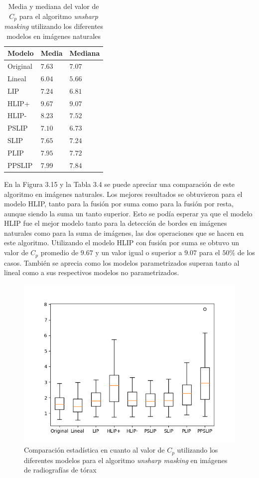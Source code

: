 \begin{table}
	\begin{center}
		\begin{tabular}{|l|l|l|}
			\hline 
			Modelo & Media & Mediana\\
			\hline
			Original & $7.63$ & $7.07$\\
			\hline
			Lineal & $6.04$ & $5.66$\\
			\hline
			LIP & $7.24$ & $6.81$\\
			\hline
			HLIP+ & $9.67$ & $9.07$\\
			\hline
			HLIP- & $8.23$ & $7.52$\\
			\hline
			PSLIP & $7.10$ & $6.73$\\
			\hline
			SLIP & $7.65$ & $7.24$\\
			\hline
			PLIP & $7.95$ & $7.72$\\
			\hline
			PPSLIP & $7.99$ & $7.84$\\
			\hline
		\end{tabular}
		\caption{Media y mediana del valor de $C_p$ para el algoritmo \textit{unsharp masking} utilizando los diferentes modelos en im\'agenes naturales}
	\end{center}
\end{table}

En la Figura 3.15 y la Tabla 3.4 se puede apreciar una comparaci\'on de este algoritmo en im\'agenes naturales. Los mejores resultados se obtuvieron para el modelo HLIP, tanto para la fusi\'on por suma como para la fusi\'on por resta, aunque siendo la suma un tanto superior. Esto se pod\'ia esperar ya que el modelo HLIP fue el mejor modelo tanto para la detecci\'on de bordes en im\'agenes naturales como para la suma de im\'agenes, las dos operaciones que se hacen en este algoritmo. Utilizando el modelo HLIP con fusi\'on por suma se obtuvo un valor de $C_p$ promedio de $9.67$ y un valor igual o superior a $9.07$ para el $50\%$ de los casos. Tambi\'en se aprecia como los modelos parametrizados superan tanto al lineal como a sus respectivos modelos no parametrizados.

\begin{figure}
	\begin{center}
		\includegraphics[width=10.0 cm]{images/graphics/torax/unsharp_masking/um_all.png}
		\caption{Comparaci\'on estad\'istica en cuanto al valor de $C_p$ utilizando los diferentes modelos para el algoritmo \textit{unsharp masking} en im\'agenes de radiograf\'ias de t\'orax}
	\end{center}
\end{figure}

